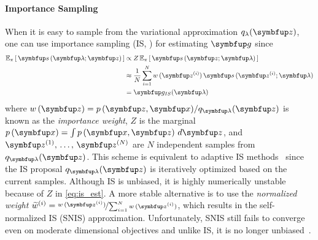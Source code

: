 \paragraph{Importance Sampling}
When it is easy to sample from the variational approximation \(q_{\lambda}(\vz)\), one can use importance sampling (IS, \citealt{robert_monte_2004}) for estimating \(\vg\) since 
\vspace{-0.05in}
\begin{align}
  \Esub{\pi}{ \vs\,(\vlambda;\vz) } 
  &\propto Z\,\Esub{\pi}{ \vs\,(\vz; \vlambda) } \label{eq:is_est} \\
  &\approx \frac{1}{N} \sum^{N}_{i=1} w\,(\vz^{(i)}) \, \vs\,(\vz^{(i)}; \vlambda) \\
  &= \vg_{IS}(\vlambda)
\end{align}
where \(w\,(\vz) = p\,(\vz,\vx) / q_{\vlambda}(\vz)\) is known as the \textit{importance weight}, \(Z\) is the marginal \(p\left(\vx\right) = \int p\left(\vx, \vz\right) \, d\vz\), and \(\vz^{(1)},\, \ldots,\, \vz^{(N)}\) are \(N\) independent samples from \(q_{\vlambda}(\vz)\).
This scheme is equivalent to adaptive IS methods~\citep{bugallo_adaptive_2017} since the IS proposal \(q_{\vlambda}(\vz)\) is iteratively optimized based on the current samples.
Although IS is unbiased, it is highly numerically unstable because of \(Z\) in \cref{eq:is_est}.
A more stable alternative is to use the \textit{normalized weight} \(\widetilde{w}^{(i)} = \nicefrac{w\,(\vz^{(i)})}{\sum_{i=1}^N w\,(\vz^{(i)}) }\), which results in the self-normalized IS (SNIS) approximation.
Unfortunately, SNIS still fails to converge even on moderate dimensional objectives and unlike IS, it is no longer unbiased~\citep{robert_monte_2004}.

